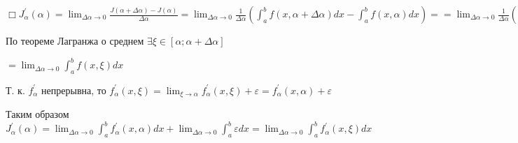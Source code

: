 \documentclass[12pt]{article}
\begin{document}
    $\displaystyle \Box J^\prime_\alpha(\alpha) = \lim_{\Delta \alpha \to 0} \frac{J(\alpha + \Delta \alpha) - J(\alpha)}{\Delta \alpha} =
    \lim_{\Delta \alpha \to 0} \frac{1}{\Delta \alpha} (\int^b_a f(x, \alpha + \Delta \alpha)dx - \int^b_a f(x, \alpha)dx) =
    = \lim_{\Delta \alpha \to 0} \frac{1}{\Delta \alpha} (\int^b_a (f(x, \alpha + \Delta \alpha) - f(x, \alpha))dx)$

    По теореме Лагранжа о среднем $\exists \xi \in [\alpha; \alpha + \Delta \alpha]$

    $\displaystyle = \lim_{\Delta \alpha \to 0} \int^b_a f(x, \xi)dx$

    Т. к. $f^\prime_\alpha$ непрерывна, то $\displaystyle f^\prime_\alpha (x, \xi) = \lim_{\xi \to \alpha} f^\prime_\alpha (x, \xi) + \varepsilon = f^\prime_\alpha (x, \alpha) + \varepsilon$

    Таким образом $\displaystyle J^\prime_\alpha(\alpha) = \lim_{\Delta \alpha \to 0} \int^{b}_{a} f^\prime_{\alpha}(x, \alpha) dx + \lim_{\Delta \alpha \to 0} \int^{b}_{a} \varepsilon dx =
    \lim_{\Delta \alpha \to 0} \int^{b}_{a} f^\prime_{\alpha}(x, \xi) dx$
\end{document}
